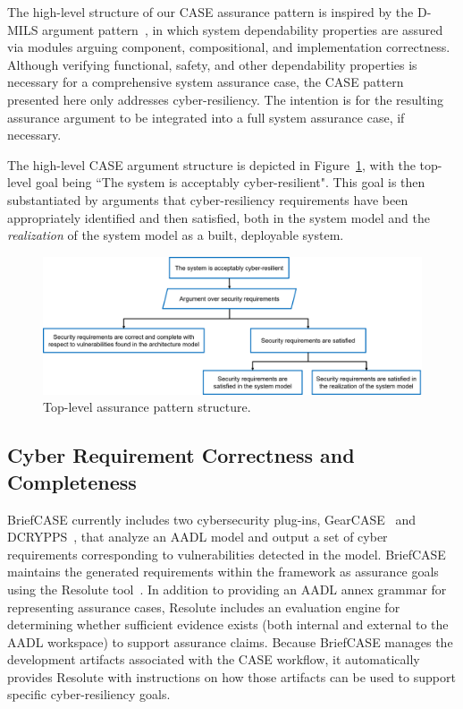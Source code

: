 The high-level structure of our CASE assurance pattern is inspired by the D-MILS argument pattern~\cite{dmils}, in which system dependability properties are assured via modules arguing component, compositional, and implementation correctness.  
Although verifying functional, safety, and other dependability properties is necessary for a comprehensive system assurance case, the CASE pattern presented here only addresses cyber-resiliency.  The intention is for the resulting assurance argument to be integrated into a full system assurance case, if necessary.

The high-level CASE argument structure is depicted in Figure~\ref{fig:top-level}, with the top-level goal being ``The system is acceptably cyber-resilient".  
This goal is then substantiated by arguments that cyber-resiliency requirements have been appropriately identified and then satisfied, both in the system model and the \textit{realization} of the system model as a built, deployable system.

\begin{figure}[h] 
	\centering 
	\includegraphics[width=\textwidth]{figs/top-level.png}
	\caption{Top-level assurance pattern structure.}
	\label{fig:top-level} 
\end{figure}



\subsection{Cyber Requirement Correctness and Completeness}
BriefCASE currently includes two cybersecurity plug-ins, GearCASE~\cite{gearcase2020} and DCRYPPS~\cite{dcrypps2019}, that analyze an AADL model and output a set of cyber requirements corresponding to vulnerabilities detected in the model.  
BriefCASE maintains the generated requirements within the framework as assurance goals using the Resolute tool~\cite{resolute2014}.  
In addition to providing an AADL annex grammar for representing assurance cases, Resolute includes an evaluation engine for determining whether sufficient evidence exists (both internal and external to the AADL workspace) to support assurance claims.  
Because BriefCASE manages the development artifacts associated with the CASE workflow, it automatically provides Resolute with instructions on how those artifacts can be used to support specific cyber-resiliency goals.


